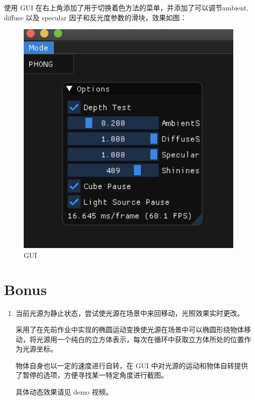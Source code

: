 \documentclass[12pt]{article}
\begin{document}
\begin{enumerate}
    使用 GUI 在右上角添加了用于切换着色方法的菜单，并添加了可以调节ambient, diffuse 以及 specular 因子和反光度参数的滑块，效果如图：
    \begin{figure}[!htb]
        \centering
        \includegraphics[scale=0.8]{GUI.png}
        \caption{GUI}
        \label{fig: gui}
    \end{figure}
\end{enumerate}

\section{ Bonus }
\begin{enumerate}
    \item 当前光源为静止状态，尝试使光源在场景中来回移动，光照效果实时更改。
    
    采用了在先前作业中实现的椭圆运动变换使光源在场景中可以椭圆形绕物体移动，将光源用一个纯白的立方体表示，每次在循环中获取立方体所处的位置作为光源坐标。
    
    物体自身也以一定的速度进行自转，在 GUI 中对光源的运动和物体自转提供了暂停的选项，方便寻找某一特定角度进行截图。

    具体动态效果请见 demo 视频。
\end{enumerate}
\end{document}
